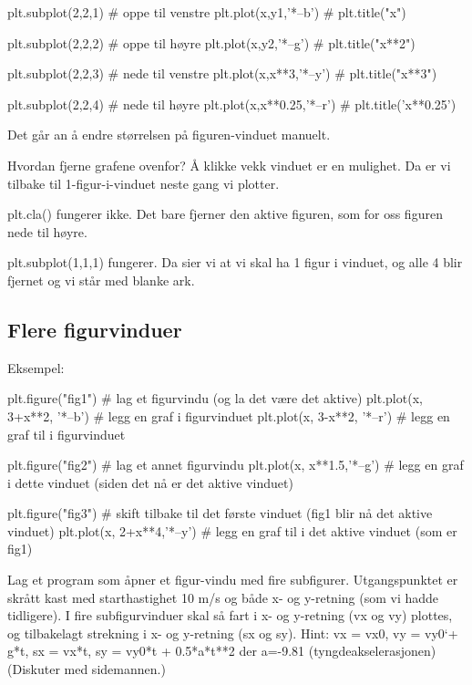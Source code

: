 \begin{usncodebox}
plt.subplot(2,2,1)          # oppe til venstre 
plt.plot(x,y1,'*--b')       # 
plt.title("x")

plt.subplot(2,2,2)          # oppe til høyre
plt.plot(x,y2,'*--g')       # 
plt.title("x**2")

plt.subplot(2,2,3)          # nede til venstre
plt.plot(x,x**3,'*--y')     # 
plt.title("x**3")

plt.subplot(2,2,4)          # nede til høyre
plt.plot(x,x**0.25,'*--r')  # 
plt.title('x**0.25')
\end{usncodebox}

Det går an å endre størrelsen på figuren-vinduet manuelt. 

Hvordan fjerne grafene ovenfor? Å klikke vekk vinduet er en mulighet. Da er vi tilbake til 1-figur-i-vinduet neste gang vi plotter. 

plt.cla()  fungerer ikke. Det bare fjerner den aktive figuren, som for oss figuren nede til høyre. 

plt.subplot(1,1,1) fungerer. Da sier vi at vi skal ha 1 figur i vinduet, og alle 4 blir fjernet 
og vi står med blanke ark. 

\subsection{Flere figurvinduer}

Eksempel:
\begin{usncodebox}
plt.figure("fig1")                     # lag et figurvindu (og la det være det aktive)
plt.plot(x, 3+x**2, '*--b')          # legg en graf i figurvinduet
plt.plot(x, 3-x**2, '*--r')          # legg en graf til i figurvinduet

plt.figure("fig2")                     # lag et annet figurvindu
plt.plot(x, x**1.5,'*--g')             # legg en graf i dette vinduet (siden det nå er det aktive vinduet)

plt.figure("fig3")                     # skift tilbake til det første vinduet (fig1 blir nå det aktive vinduet)
plt.plot(x, 2+x**4,'*--y')             # legg en graf til i det aktive vinduet (som er fig1)
\end{usncodebox}

\begin{question}
Lag et program som åpner et figur-vindu med fire subfigurer. Utgangspunktet er skrått kast med starthastighet 10 m/s og både x- og y-retning (som vi hadde tidligere). I fire subfigurvinduer skal så fart i x- og y-retning (vx og vy) plottes, og tilbakelagt strekning i x- og y-retning (sx og sy). Hint: vx = vx0, vy = vy0`+ g*t, sx = vx*t, sy = vy0*t + 0.5*a*t**2  der a=-9.81 (tyngdeakselerasjonen) (Diskuter med sidemannen.) 
\end{question}

